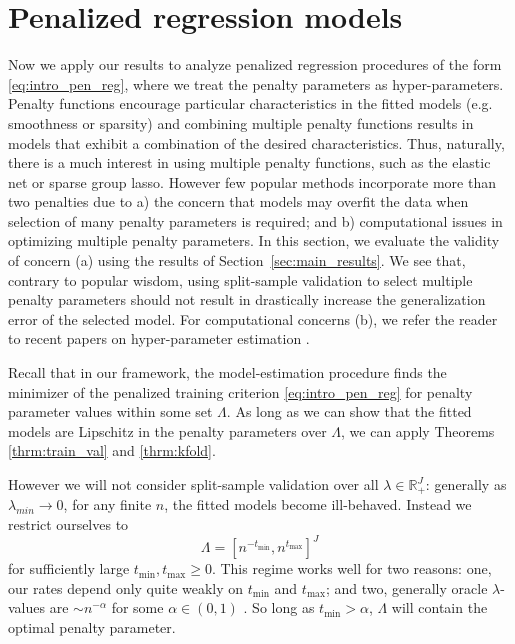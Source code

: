 \documentclass[12pt]{article} %
\theoremstyle{definition}
\begin{document}
\section{Penalized regression models}
\label{sec:examples}
Now we apply our results to analyze penalized regression procedures of the form \eqref{eq:intro_pen_reg}, where we treat the penalty parameters as hyper-parameters.
Penalty functions encourage particular characteristics in the fitted models (e.g. smoothness or sparsity) and combining multiple penalty functions results in models that exhibit a combination of the desired characteristics. 
Thus, naturally, there is a much interest in using multiple penalty functions, such as the elastic net or sparse group lasso.
However few popular methods incorporate more than two penalties due to a) the concern that models may overfit the data when selection of many penalty parameters is required; and b) computational issues in optimizing multiple penalty parameters. In this section, we evaluate the validity of concern (a) using the results of Section~\ref{sec:main_results}. We see that, contrary to popular wisdom, using split-sample validation to select multiple penalty parameters should not result in drastically increase the generalization error of the selected model. For computational concerns (b), we refer the reader to recent papers on hyper-parameter estimation \citep{bengio2000gradient, foo2008efficient, snoek2012practical}.

Recall that in our framework, the model-estimation procedure finds the minimizer of the penalized training criterion \eqref{eq:intro_pen_reg} for penalty parameter values within some set $\Lambda$. As long as we can show that the fitted models are Lipschitz in the penalty parameters over $\Lambda$, we can apply Theorems \ref{thrm:train_val} and \ref{thrm:kfold}.

However we will not consider split-sample validation over all $\lambda\in\mathbb{R}^J_+$: generally as $\lambda_{min} \rightarrow 0$, for any finite $n$, the fitted models become ill-behaved. Instead we restrict ourselves to 
\begin{equation}
\label{thrm:lambda_range}
\Lambda = [ n^{-t_{\min}}, n^{t_{\max}}]^J
\end{equation}
for sufficiently large $t_{\min}, t_{\max} \ge 0$. This regime works well for two reasons: one, our rates depend only quite weakly on $t_{\min}$ and $t_{\max}$; and two, generally oracle $\lambda$-values are $\sim n^{-\alpha}$ for some $\alpha \in (0,1)$ \citep{van2000empirical, van2014additive, buhlmann2011statistics}. So long as $t_{\min} > \alpha$, $\Lambda$ will contain the optimal penalty parameter.
\end{document}
